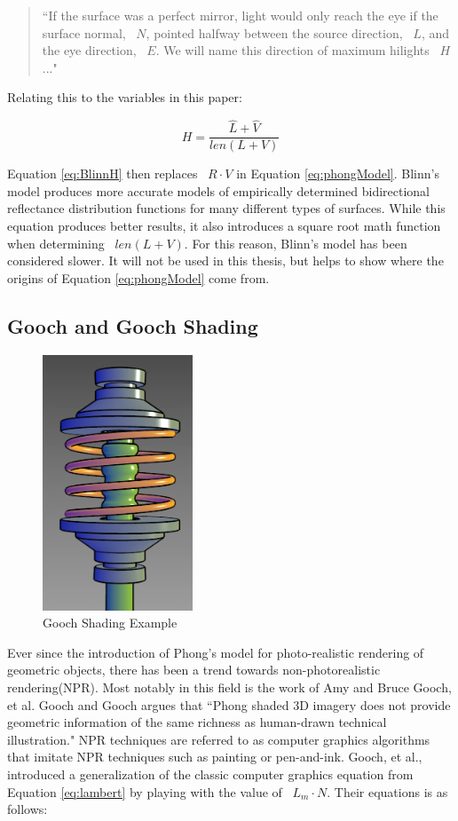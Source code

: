 \begin{quote}
``If the surface was a perfect mirror, light would only reach the eye if the surface normal, ~$N$, pointed halfway between the source direction, ~$L$, and the eye direction, ~$E$.  We will name this direction of maximum hilights ~$H$..."
\end{quote}

Relating this to the variables in this paper:

\begin{equation}
\label{eq:BlinnH}
H = \frac{\hat{L} + \hat{V}}{len(L+V)}
\end{equation}

Equation \ref{eq:BlinnH} then replaces ~$R \cdot V$ in Equation \ref{eq:phongModel}.  Blinn's model produces more accurate models of empirically determined  bidirectional reflectance distribution functions for many different types of surfaces\cite{ngan2004experimental}.  While this equation produces better results, it also introduces a square root math function when determining  ~$len(L+V)$.  For this reason, Blinn's model has been considered slower.  It will not be used in this thesis, but helps to show where the origins of Equation \ref{eq:phongModel} come from.

\subsection{Gooch and Gooch Shading}
\label{subsec:GoochShading}
\begin{figure}[h]
\centering
\includegraphics[height=3.0in]{figures/gooch.jpg}
\caption{Gooch Shading Example\cite{gooch1998non}}
\label{fig:gooch}
\end{figure}
Ever since the introduction of Phong's model for photo-realistic rendering of geometric objects, there has been a trend towards non-photorealistic rendering(NPR).  Most notably in this field is the work of Amy and Bruce Gooch, et al.  Gooch and Gooch argues that ``Phong shaded 3D imagery does not provide geometric information of the same richness as human-drawn technical illustration\cite{gooch1998non}."    NPR techniques are referred to as computer graphics algorithms that imitate NPR techniques such as painting or pen-and-ink\cite{gooch1998non}.  Gooch, et al., introduced a generalization of the classic computer graphics equation from Equation \ref{eq:lambert} by playing with the value of ~$L_{m} \cdot N$.  Their equations is as follows:

